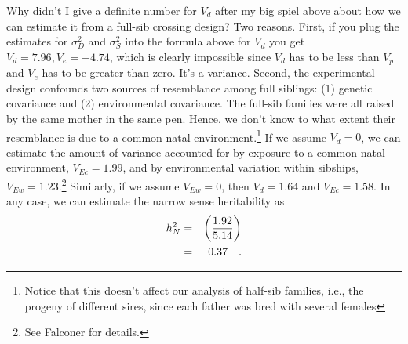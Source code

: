 \documentclass[12pt]{article}
\begin{document}
Why didn't I give a definite number for $V_d$ after my big spiel above
about how we can estimate it from a full-sib crossing design?  Two
reasons.  First, if you plug the estimates for $\sigma^2_D$ and
$\sigma^2_S$ into the formula above for $V_d$ you get $V_d = 7.96, V_e
= -4.74$, which is clearly impossible since $V_d$ has to be less than
$V_p$ and $V_e$ has to be greater than zero. It's a variance.  Second,
the experimental design confounds two sources of resemblance among
full siblings: (1) genetic covariance and (2) environmental
covariance.  The full-sib families were all raised by the same mother
in the same pen. Hence, we don't know to what extent their resemblance
is due to a common natal environment.\footnote{Notice that this
  doesn't affect our analysis of half-sib families, i.e., the progeny
  of different sires, since each father was bred with several females}
If we assume $V_d = 0$, we can estimate the amount of variance
accounted for by exposure to a common natal environment, $V_{Ec} =
1.99$, and by environmental variation within sibships, $V_{Ew} =
1.23$.\footnote{See Falconer for details.}  Similarly, if we assume
$V_{Ew} = 0$, then $V_d = 1.64$ and $V_{Ec} = 1.58$.  In any case, we
can estimate the narrow sense heritability as
\begin{eqnarray*}
h^2_N &=& \left({1.92 \over 5.14}\right) \\
      &=& 0.37 \quad .
\end{eqnarray*}

\ccLicense
\end{document}
